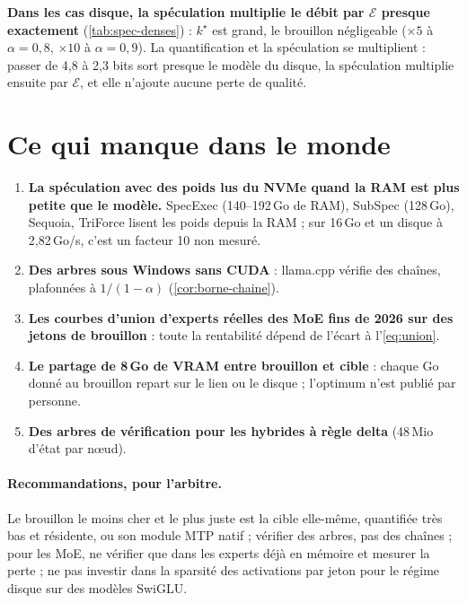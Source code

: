 \textbf{Dans les cas disque, la spéculation multiplie le débit par $\mathcal E$ presque exactement} (\cref{tab:spec-denses}) : $k^\star$ est grand, le brouillon négligeable ($\times5$ à $\alpha = 0{,}8$, $\times10$ à $\alpha = 0{,}9$). La quantification et la spéculation se multiplient : passer de 4,8 à 2,3 bits sort presque le modèle du disque, la spéculation multiplie ensuite par $\mathcal E$, et elle n'ajoute aucune perte de qualité.

\section{Ce qui manque dans le monde}

\begin{enumerate}
\item \textbf{La spéculation avec des poids lus du NVMe quand la RAM est plus petite que le modèle.} SpecExec (140--192\,Go de RAM), SubSpec (128\,Go), Sequoia, TriForce lisent les poids depuis la RAM ; sur 16\,Go et un disque à 2,82\,Go/s, c'est un facteur 10 non mesuré.
\item \textbf{Des arbres sous Windows sans CUDA} : llama.cpp vérifie des chaînes, plafonnées à $1/(1-\alpha)$ (\cref{cor:borne-chaine}).
\item \textbf{Les courbes d'union d'experts réelles des MoE fins de 2026 sur des jetons de brouillon} : toute la rentabilité dépend de l'écart à l'\cref{eq:union}.
\item \textbf{Le partage de 8\,Go de VRAM entre brouillon et cible} : chaque Go donné au brouillon repart sur le lien ou le disque ; l'optimum n'est publié par personne.
\item \textbf{Des arbres de vérification pour les hybrides à règle delta} (48\,Mio d'état par nœud).
\end{enumerate}

\paragraph{Recommandations, pour l'arbitre.} Le brouillon le moins cher et le plus juste est la cible elle-même, quantifiée très bas et résidente, ou son module MTP natif ; vérifier des arbres, pas des chaînes ; pour les MoE, ne vérifier que dans les experts déjà en mémoire et mesurer la perte ; ne pas investir dans la sparsité des activations par jeton pour le régime disque sur des modèles SwiGLU.

